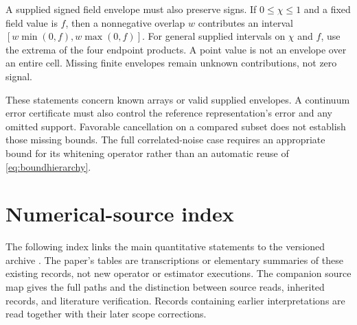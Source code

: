A supplied signed field envelope must also preserve signs. If $0\leq\chi\leq1$ and a fixed field value is $f$, then a nonnegative overlap $w$ contributes an interval $[w\min(0,f),w\max(0,f)]$. For general supplied intervals on $\chi$ and $f$, use the extrema of the four endpoint products. A point value is not an envelope over an entire cell. Missing finite envelopes remain unknown contributions, not zero signal.

These statements concern known arrays or valid supplied envelopes. A continuum error certificate must also control the reference representation's error and any omitted support. Favorable cancellation on a compared subset does not establish those missing bounds. The full correlated-noise case requires an appropriate bound for its whitening operator rather than an automatic reuse of \eqref{eq:boundhierarchy}.

\section{Numerical-source index}\label{app:records}
The following index links the main quantitative statements to the versioned archive \cite{archive}. The paper's tables are transcriptions or elementary summaries of these existing records, not new operator or estimator executions. The companion source map gives the full paths and the distinction between source reads, inherited records, and literature verification. Records containing earlier interpretations are read together with their later scope corrections.

